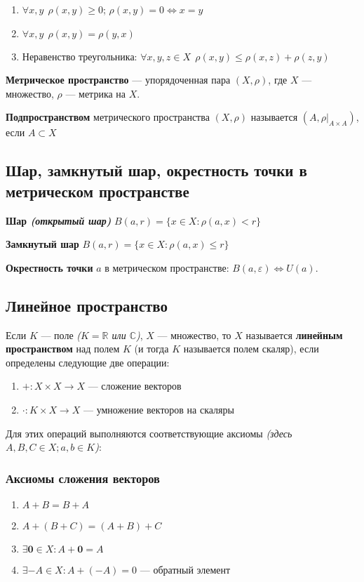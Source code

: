 \begin{enumerate}
    \itemsep0em
    \item $\forall x,y \ \ \rho(x,y)\geq 0$; $\rho(x,y)=0 \Leftrightarrow x=y$
    \item $\forall x,y \ \ \rho(x,y)=\rho(y,x)$
    \item Неравенство треугольника: $\forall x,y,z\in X \ \ \rho(x,y)\leq \rho(x,z)+\rho(z,y)$
\end{enumerate}

\textbf{Метрическое пространство} --- упорядоченная пара $(X, \rho)$, где $X$ --- множество, $\rho$ --- метрика на $X$.

\textbf{Подпространством} метрического пространства $(X,\rho)$ называется $(A, \rho|_{A\times A})$, если $A\subset X$

\subsection{Шар, замкнутый шар, окрестность точки в метрическом пространстве}

\textbf{Шар \textit{(открытый шар)}} $B(a,r)=\{x\in X : \rho(a,x)<r\}$

\textbf{Замкнутый шар} $B(a,r)=\{x\in X : \rho(a,x)\leq r\}$

\textbf{Окрестность точки} $a$ в метрическом пространстве: $B(a, \varepsilon) \Leftrightarrow U(a)$.

\subsection{Линейное пространство}

Если $K$ --- поле \textit{($K=\mathbb{R}$ или $\mathbb{C}$)}, $X$ --- множество, то $X$ называется \textbf{линейным пространством} над полем $K$ (и тогда $K$ называется полем скаляр), если определены следующие две операции:
\begin{enumerate}
\item $+:X\times X \to X$ --- сложение векторов
\item $\cdot:K\times X\to X$ --- умножение векторов на скаляры
\end{enumerate}

Для этих операций выполняются соответствующие аксиомы \textit{(здесь $A,B,C\in X; a,b\in K$)}:

\subsubsection{Аксиомы сложения векторов}
\begin{enumerate}\itemsep0em
    \item $A+B=B+A$
    \item $A+(B+C)=(A+B)+C$
    \item $\exists \bm 0 \in X : A+\bm 0 = A$
    \item $\exists -A\in X : A+(-A)=0$ --- обратный элемент
\end{enumerate}

